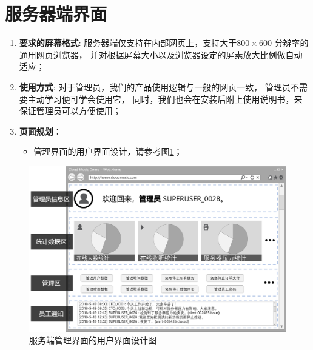 \section{服务器端界面}
\begin{enumerate}
	\item \textbf{要求的屏幕格式}:
		服务器端仅支持在内部网页上，支持大于$800 \times 600$ 分辨率的通用网页浏览器，
		并对根据屏幕大小以及浏览器设定的屏素放大比例做自动适应；
	\item \textbf{使用方式}:
		对于管理员，我们的产品使用逻辑与一般的网页一致，
			管理员不需要主动学习便可学会使用它，
		同时，我们也会在安装后附上使用说明书，来保证管理员可以方便使用；
	\item \textbf{页面规划}： 
	\begin{itemize}
		\item 管理界面的用户界面设计，请参考图\ref{fig:sudo}；
	\end{itemize}
\end{enumerate}

\begin{figure}[h!]
  \centering

  \includegraphics[width=.99\linewidth]{figures/sudo}

  \caption{  \label{fig:sudo}
  		服务端管理界面的用户界面设计图
    }
\end{figure}